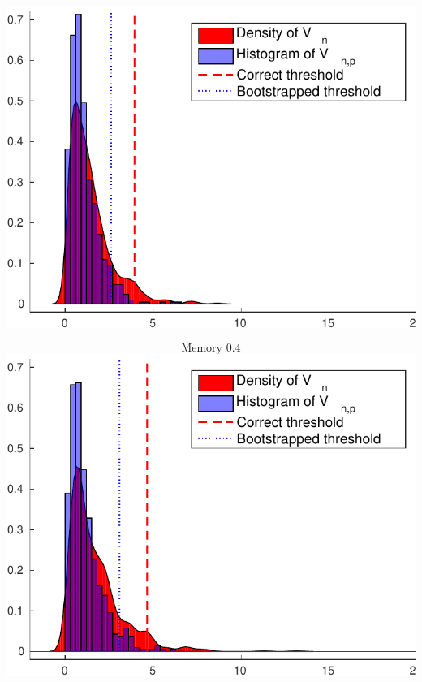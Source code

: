 \documentclass[landscape,a0]{a0poster_csml_v2}
\begin{document}
\begin{poster}
\begin{PosterColumn}
\begin{minipage}[c]{0.24\textwidth}
\includegraphics[width=\textwidth]{../img/permfail_ecdf3.pdf} 
\end{minipage}
\begin{minipage}[c]{0.24\textwidth}
$$\text{Memory }0.4$$
\includegraphics[width=\textwidth]{../img/permfail_ecdf4.pdf} 
\end{minipage}


\end{PosterColumn}
\end{poster}
\end{document}
